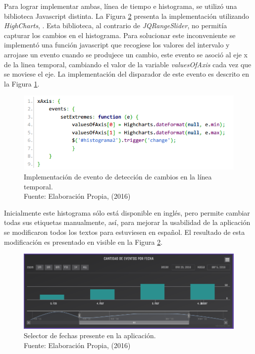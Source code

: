 Para lograr implementar ambas, línea de tiempo e histograma, se utilizó una biblioteca Javascript distinta. La Figura \ref{fig:HistogramaFinal} presenta la implementación utilizando \textit{HighCharts}, \cite{Highcharts}. Esta biblioteca, al contrario de \textit{JQRangeSlider}, no permitía capturar los cambios en el histograma. Para solucionar este inconveniente se implementó una función javascript que recogiese los valores del intervalo y arrojase un evento cuando se produjece un cambio, este evento se asoció al eje x de la linea temporal, cambiando el valor de la variable \textit{valuesOfAxis} cada vez que se moviese el eje. La implementación del disparador de este evento es descrito en la Figura \ref{fig:implementacionCambiosEnEje}.

\begin{figure}[H]
	\centering
	\captionsetup{justification=centering}
	\includegraphics[scale=0.8]{images/onChangeEventTimeline.png}
	\caption[Implementación de evento de detección de cambios en la línea temporal.]{Implementación de evento de detección de cambios en la línea temporal.\\Fuente: Elaboración Propia, (2016)}
	\label{fig:implementacionCambiosEnEje}
\end{figure}

Inicialmente este histograma sólo está disponible en inglés, pero permite cambiar todas sus etiquetas manualmente, así, para mejorar la usabilidad de la aplicación se modificaron todos los textos para estuviesen en español. El resultado de esta modificación es presentado en visible en la Figura \ref{fig:HistogramaFinal}.

\begin{figure}[H]
	\centering
	\captionsetup{justification=centering}
	\includegraphics[scale=0.6]{images/Histograma.png}
	\caption[Selector de fechas presente en la aplicación.]{Selector de fechas presente en la aplicación.\\Fuente: Elaboración Propia, (2016)}
	\label{fig:HistogramaFinal}
\end{figure}


